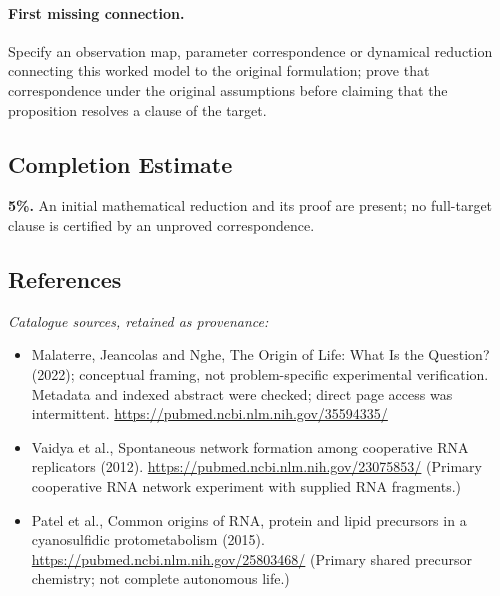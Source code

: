 \documentclass[11pt]{article}
\begin{document}
\paragraph{First missing connection.} Specify an observation map, parameter correspondence or dynamical reduction connecting this worked model to the original formulation; prove that correspondence under the original assumptions before claiming that the proposition resolves a clause of the target.
\subsection{Completion Estimate}
\textbf{5\%.} An initial mathematical reduction and its proof are present; no full-target clause is certified by an unproved correspondence.
\subsection{References}
\noindent\emph{Catalogue sources, retained as provenance:}
\begin{itemize}
\item Malaterre, Jeancolas and Nghe, The Origin of Life: What Is the Question? (2022); conceptual framing, not problem-specific experimental verification. Metadata and indexed abstract were checked; direct page access was intermittent. \url{https://pubmed.ncbi.nlm.nih.gov/35594335/}
\item Vaidya et al., Spontaneous network formation among cooperative RNA replicators (2012). \url{https://pubmed.ncbi.nlm.nih.gov/23075853/} (Primary cooperative RNA network experiment with supplied RNA fragments.)
\item Patel et al., Common origins of RNA, protein and lipid precursors in a cyanosulfidic protometabolism (2015). \url{https://pubmed.ncbi.nlm.nih.gov/25803468/} (Primary shared precursor chemistry; not complete autonomous life.)
\end{itemize}
\end{document}
